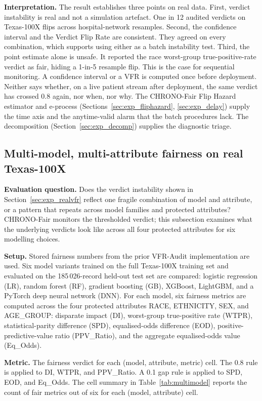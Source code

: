 \documentclass[acmsmall,nonacm,review,anonymous]{acmart}
\newcommand{\1}[1]{\mathbf{1}\!\left\{#1\right\}}
\begin{document}
\textbf{Interpretation.}
The result establishes three points on real data. First, verdict instability is real and not a simulation artefact. One in 12 audited verdicts on Texas-100X flips across hospital-network resamples. Second, the confidence interval and the Verdict Flip Rate are consistent. They agreed on every combination, which supports using either as a batch instability test. Third, the point estimate alone is unsafe. It reported the race worst-group true-positive-rate verdict as fair, hiding a 1-in-5 resample flip. This is the case for sequential monitoring. A confidence interval or a VFR is computed once before deployment. Neither says whether, on a live patient stream after deployment, the same verdict has crossed 0.8 again, nor when, nor why. The CHRONO-Fair Flip Hazard estimator and e-process (Sections~\ref{sec:exp_fliphazard}, \ref{sec:exp_delay}) supply the time axis and the anytime-valid alarm that the batch procedures lack. The decomposition (Section~\ref{sec:exp_decomp}) supplies the diagnostic triage.

\subsection{Multi-model, multi-attribute fairness on real Texas-100X}\label{sec:exp_multimodel}

\textbf{Evaluation question.}
Does the verdict instability shown in Section~\ref{sec:exp_realvfr} reflect one fragile combination of model and attribute, or a pattern that repeats across model families and protected attributes? CHRONO-Fair monitors the thresholded verdict; this subsection examines what the underlying verdicts look like across all four protected attributes for six modelling choices.

\textbf{Setup.}
Stored fairness numbers from the prior VFR-Audit implementation are used. Six model variants trained on the full Texas-100X training set and evaluated on the 185\,026-record held-out test set are compared: logistic regression (LR), random forest (RF), gradient boosting (GB), XGBoost, LightGBM, and a PyTorch deep neural network (DNN). For each model, six fairness metrics are computed across the four protected attributes RACE, ETHNICITY, SEX, and AGE\_GROUP: disparate impact (DI), worst-group true-positive rate (WTPR), statistical-parity difference (SPD), equalised-odds difference (EOD), positive-predictive-value ratio (PPV\_Ratio), and the aggregate equalised-odds value (Eq\_Odds).

\textbf{Metric.}
The fairness verdict for each (model, attribute, metric) cell. The 0.8 rule is applied to DI, WTPR, and PPV\_Ratio. A 0.1 gap rule is applied to SPD, EOD, and Eq\_Odds. The cell summary in Table~\ref{tab:multimodel} reports the count of fair metrics out of six for each (model, attribute) cell.
\end{document}
